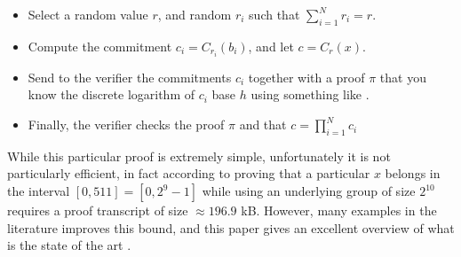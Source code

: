 \documentclass{article}
\begin{document}
\begin{itemize}
    \item Select a random value $r$, and random $r_i$ such that $\sum_{i = 1}^N r_i = r$.
    \item Compute the commitment $c_i = C_{r_i}(b_i)$, and let $c = C_r(x)$.
    \item Send to the verifier the commitments $c_i$ together with a proof $\pi$ that you know the discrete logarithm of $c_i$ base $h$ using something like \cite{schnorrEfficientSignatureGeneration1991}.
    \item Finally, the verifier checks the proof $\pi$ and that $c = \prod_{i=1}^N c_i$
\end{itemize}

While this particular proof is extremely simple, unfortunately it is not particularly efficient, in fact according to \cite{boudotEfficientProofsThat2000}
proving that a particular $x$ belongs in the interval $[0, 511] = [0, 2^9 -1]$ while using an underlying group of size $2^10$ requires a proof 
transcript of size $\approx 196.9$ kB. However, many examples in the literature improves this bound, and this paper gives 
an excellent overview of what is the state of the art \cite{moraisSurveyZeroKnowledge2019}.


\appendix
\end{document}
